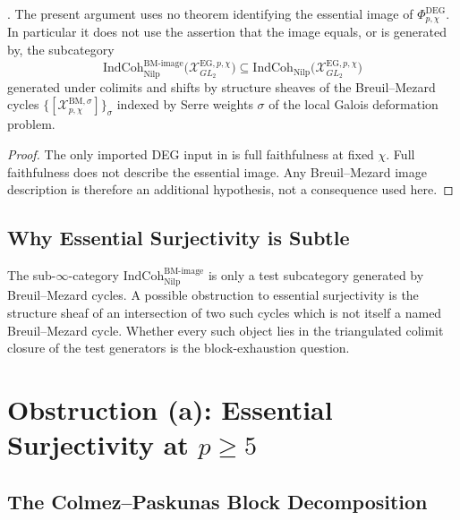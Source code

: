 \begin{proposition}
\label{v4-arith:deg-f1a:prop:deg-image}
\ClaimStatusProvedHere. The present argument uses no theorem
identifying the essential image of
\(\Phi^{\mathrm{DEG}}_{p,\chi}\).  In particular it does not use the
assertion that the image equals, or is generated by, the subcategory
\[
\mathrm{IndCoh}_{\mathrm{Nilp}}^{\mathrm{BM\text{-}image}}\bigl(\mathcal{X}^{\mathrm{EG},p,\chi}_{GL_{2}}\bigr)
\subseteq\mathrm{IndCoh}_{\mathrm{Nilp}}\bigl(\mathcal{X}^{\mathrm{EG},p,\chi}_{GL_{2}}\bigr)
\]
generated under colimits and shifts by structure sheaves of the
Breuil--Mezard cycles
\(\{[\mathcal{X}^{\mathrm{BM},\sigma}_{p,\chi}]\}_{\sigma}\)
indexed by Serre weights \(\sigma\) of the local Galois deformation
problem.
\end{proposition}

\begin{proof}
The only imported DEG input in 
is full faithfulness at fixed \(\chi\).  Full faithfulness does not
describe the essential image.  Any Breuil--Mezard image description
is therefore an additional hypothesis, not a consequence used here.
\end{proof}

\subsection{Why Essential Surjectivity is Subtle}

\begin{remark}
\label{v4-arith:deg-f1a:rem:deg-fails-surj-intuition}
The sub-\(\infty\)-category
\(\mathrm{IndCoh}_{\mathrm{Nilp}}^{\mathrm{BM\text{-}image}}\) is only
a test subcategory generated by Breuil--Mezard cycles.  A possible
obstruction to essential surjectivity is the structure sheaf of an
intersection of two such cycles which is not itself a named
Breuil--Mezard cycle.  Whether every such object lies in the
triangulated colimit closure of the test generators is the
block-exhaustion question.
\end{remark}

\section{Obstruction (a): Essential Surjectivity at \(p\geq 5\)}
\label{v4-arith:deg-f1a:ess-surj}

\subsection{The Colmez--Paskunas Block Decomposition}

